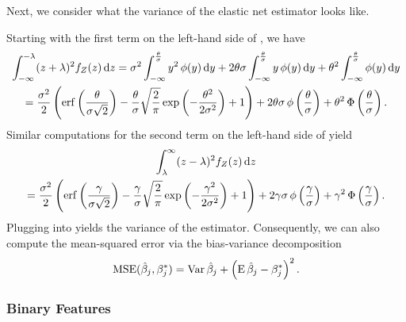 Next, we consider what the variance of the elastic net estimator looks like.

Starting with the first term on the left-hand side of , we have
\begin{multline}
  \label{eq:mc-var-part1}
  \int_{-\infty}^{-\lambda}(z+ \lambda)^2 f_Z(z) \mathop{}\!\mathrm{d} z = \sigma^2 \int_{-\infty}^{\frac{\theta}{\sigma}} y^2 \operatorname{\phi}(y) \mathop{}\!\mathrm{d} y + 2 \theta \sigma \int_{-\infty}^{\frac{\theta}{\sigma}} y \operatorname{\phi}(y) \mathop{}\!\mathrm{d} y + \theta^2 \int_{-\infty}^{\frac{\theta}{\sigma}} \operatorname{\phi}(y) \mathop{}\!\mathrm{d} y \\
  = \frac{\sigma^2}{2} \left( \operatorname{erf}\left(\frac{\theta}{\sigma\sqrt{2}}\right) - \frac{\theta}{\sigma}\sqrt{\frac{2}{\pi}} \exp\left(-\frac{\theta^2}{2\sigma^2}\right) + 1 \right) + 2 \theta \sigma \operatorname{\phi} \left(\frac{\theta}{\sigma}\right) + \theta^2 \operatorname{\Phi}\left(\frac{\theta}{\sigma}\right).
\end{multline}
Similar computations for the second term on the left-hand side of  yield
\begin{multline}
  \label{eq:mc-var-part2}
  \int_{\lambda}^{\infty}(z - \lambda)^2 f_Z(z) \mathop{}\!\mathrm{d} z \\
  = \frac{\sigma^2}{2} \left( \operatorname{erf}\left(\frac{\gamma}{\sigma\sqrt{2}}\right) - \frac{\gamma}{\sigma}\sqrt{\frac{2}{\pi}} \exp\left(-\frac{\gamma^2}{2\sigma^2}\right) + 1 \right) + 2 \gamma \sigma \operatorname{\phi} \left(\frac{\gamma}{\sigma}\right) + \gamma^2 \operatorname{\Phi}\left(\frac{\gamma}{\sigma}\right).
\end{multline}
Plugging  into  yields the variance of the estimator. Consequently, we can also compute the mean-squared error via the bias-variance decomposition
\begin{equation}
  \label{eq:betahat-mse}
  \operatorname{MSE} (\hat\beta_j, \beta^*_j) = \operatorname{Var}\hat\beta_j + \left(\operatorname{E} \hat\beta_j - \beta^*_j\right)^2.
\end{equation}

\subsubsection{Binary Features}

